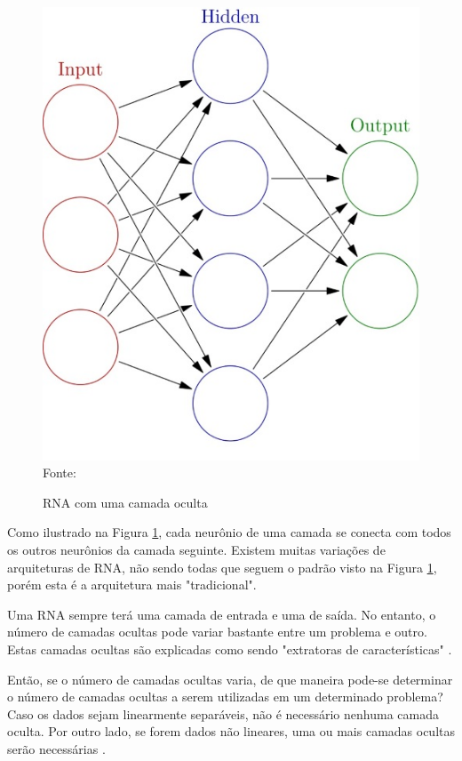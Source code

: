 \documentclass[
	12pt,					%
	openright,				%
	oneside,				%
	a4paper,				%
	bibjustif,				%
	chapter=TITLE,			%
	english,				%
	brazil,					%
	]{abntex2}
\newcommand{\source}[1]{\small Fonte: {#1}}
\begin{document}
	\begin{figure}[ht!]
		\caption{RNA com uma camada oculta}
		\centering
		\includegraphics[scale=0.45]{img/BasicNN.jpg}\\
		\vspace{0.5mm}
		\source{}
		\label{fig:basicnn}
	\end{figure}
	
	Como ilustrado na Figura \ref{fig:basicnn},
	cada neurônio de uma camada se conecta com todos os outros neurônios da camada seguinte.
	Existem muitas variações de arquiteturas de RNA,
	não sendo todas que seguem o padrão visto na Figura \ref{fig:basicnn},
	porém esta é a arquitetura mais "tradicional"{}.
	
	Uma RNA sempre terá uma camada de entrada e uma de saída.
	No entanto, o número de camadas ocultas pode variar bastante entre um problema e outro.
	Estas camadas ocultas são explicadas como sendo "extratoras de características"{}
	\cite{stackExchange2}.
	
	Então, se o número de camadas ocultas varia,
	de que maneira pode-se determinar o número de camadas ocultas a serem utilizadas em um determinado problema?
	Caso os dados sejam linearmente separáveis,
	não é necessário nenhuma camada oculta.
	Por outro lado, se forem dados não lineares,
	uma ou mais camadas ocultas serão necessárias
	\cite{stackExchange1}.
	
\end{document}

